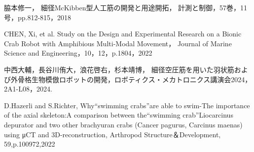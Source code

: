 \documentclass{jarticle}
\begin{document}
\begin{thebibliography}{99}
  脇本修一，
  細径McKibben型人工筋の開発と用途開拓，
  計測と制御，57巻，11号，pp.812-815，2018
  
  CHEN, Xi, et al. Study on the Design and Experimental Research on a Bionic Crab Robot with Amphibious Multi-Modal Movement， Journal of Marine Science and Engineering，10，12，p.1804，2022
  
  中西大輔，長谷川侑大，浪花啓右，杉本靖博，
  細径空圧筋を用いた羽状筋および外骨格生物模倣ロボットの開発，ロボティクス・メカトロニクス講演会2024，2A1-L08，2024.

  D.Hazerli and S.Richter,
  Why“swimming crabs”are able to swim-The importance of the axial skeleton:A comparison between the“swimming crab”Liocarcinus depurator and two other brachyuran crabs (Cancer pagurus, Carcinus maenas) using μCT and 3D-reconstruction,
  Arthropod Structure＆Development,
  59,p.100972,2022

 \end{thebibliography}
\end{document}
